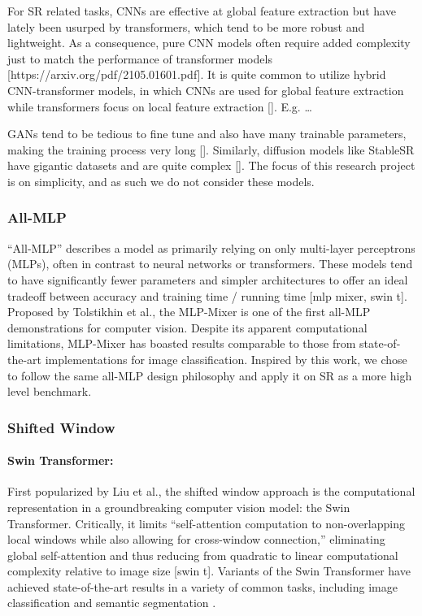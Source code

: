 \documentclass{article}
\begin{document}
For SR related tasks, CNNs are effective at global feature extraction but have lately been usurped by transformers, which tend to be more robust and lightweight. As a consequence, pure CNN models often require added complexity just to match the performance of transformer models [https://arxiv.org/pdf/2105.01601.pdf]. It is quite common to utilize hybrid CNN-transformer models, in which CNNs are used for global feature extraction while transformers focus on local feature extraction []. E.g. …

GANs tend to be tedious to fine tune and also have many trainable parameters, making the training process very long []. Similarly, diffusion models like StableSR have gigantic datasets and are quite complex []. The focus of this research project is on simplicity, and as such we do not consider these models.

\subsubsection{All-MLP}

“All-MLP” describes a model as primarily relying on only multi-layer perceptrons (MLPs), often in contrast to neural networks or transformers. These models tend to have significantly fewer parameters and simpler architectures to offer an ideal tradeoff between accuracy and training time / running time [mlp mixer, swin t]. Proposed by Tolstikhin et al., the MLP-Mixer is one of the first all-MLP demonstrations for computer vision. Despite its apparent computational limitations, MLP-Mixer has boasted results comparable to those from state-of-the-art implementations for image classification. Inspired by this work, we chose to follow the same all-MLP design philosophy and apply it on SR as a more high level benchmark.

\subsubsection{Shifted Window}

\paragraph{Swin Transformer:} First popularized by Liu et al., the shifted window approach is the computational representation in a groundbreaking computer vision model: the Swin Transformer. Critically, it limits “self-attention computation to non-overlapping local windows while also allowing for cross-window connection,” eliminating global self-attention and thus reducing from quadratic to linear computational complexity relative to image size [swin t]. Variants of the Swin Transformer have achieved state-of-the-art results in a variety of common tasks, including image classification and semantic segmentation \citep{liang2021swinir}.
\end{document}
